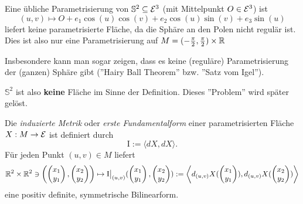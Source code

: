 \begin{example}
	
	Eine übliche Parametrisierung von $ \mathbb{S}^2 \subseteq \mathcal E^3 $ (mit Mittelpunkt $O \in \mathcal E^3$) ist  
	\[ (u,v) \mapsto O + e_1\cos(u)\cos(v) + e_2\cos(u)\sin(v)+e_3\sin(u) \]
	liefert keine parametrisierte Fläche, da die Sphäre an den Polen nicht regulär ist.
	Dies ist also nur eine Parametrisierung auf $ M = (-\frac{\pi}{2},\frac{\pi}{2}) \times \mathbb R $
	
	Insbesondere kann man sogar zeigen, dass es keine (reguläre) Parametrisierung der (ganzen) Sphäre gibt (''Hairy Ball Theorem'' bzw. ''Satz vom Igel'').
	
	$ \mathbb{S}^2 $ ist also \textbf{keine} Fläche im Sinne der Definition. Dieses ''Problem'' wird später gelöst.
\end{example}

\begin{lemma, definition}
	
	Die \emph{induzierte Metrik} oder \emph{erste Fundamentalform} einer parametrisierten Fläche $ X: M \rightarrow \mathcal E$ ist definiert durch
	\[ \mathrm{I} := \langle dX,dX \rangle. \]
	Für jeden Punkt $ (u,v) \in M $ liefert 
	\[ \mathbb R^2 \times \mathbb R^2 \ni \left( \begin{pmatrix} x_1\\y_1 \end{pmatrix}, \begin{pmatrix} x_2\\y_2 \end{pmatrix} \right)  \mapsto \mathrm{I} \big|_{(u,v)}(\begin{pmatrix}
	x_1 \\
	y_1
	\end{pmatrix},\begin{pmatrix}
	x_2 \\
	y_2
	\end{pmatrix}) := \left\langle d_{(u,v)}X(\begin{pmatrix}
	x_1 \\
	y_1
	\end{pmatrix}),  d_{(u,v)}X(\begin{pmatrix}
	x_2 \\
	y_2
	\end{pmatrix})  \right\rangle \]
	eine positiv definite, symmetrische Bilinearform.
\end{lemma, definition}

